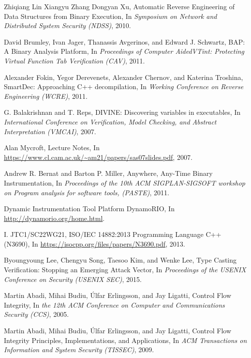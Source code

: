 \documentclass[11pt,a4paper,bibtotoc,idxtotoc,headsepline,footsepline,footexclude,BCOR20mm,DIV10]{scrbook}
\begin{document}
\begin{thebibliography}{50}
Zhiqiang Lin Xiangyu Zhang Dongyan Xu,
{Automatic Reverse Engineering of Data Structures from Binary Execution}, In
\emph{Symposium on Network and Distributed System Security (NDSS)}, 2010.

David Brumley, Ivan Jager, Thanassis Avgerinos, and Edward J. Schwartz,
{BAP: A Binary Analysis Platform}, 
In \emph{Proceedings of Computer AidedVTint: Protecting Virtual Function Tab Verification (CAV)}, 2011.

Alexander Fokin, Yegor Derevenets, Alexander Chernov, and Katerina Troshina,
{SmartDec: Approaching C++ decompilation}, 
In \emph{Working Conference on Reverse Engineering (WCRE)}, 2011.

G. Balakrishnan and T. Reps,
{DIVINE: Discovering variables in executables}, 
In \emph{International Conference on Verification, Model Checking, and Abstract Interpretation (VMCAI)}, 2007.

Alan Mycroft,
{Lecture Notes}, 
In \url{https://www.cl.cam.ac.uk/~am21/papers/sas07slides.pdf}, 2007.

Andrew R. Bernat and Barton P. Miller,
{Anywhere, Any-Time Binary Instrumentation}, 
In \emph{Proceedings of the 10th ACM SIGPLAN-SIGSOFT workshop on Program analysis for software tools, (PASTE)}, 2011.

Dynamic Instrumentation Tool Platform
{DynamoRIO}, 
In \url{http://dynamorio.org/home.html}.

I. JTC1/SC22WG21,
{ISO/IEC 14882:2013 Programming Language C++ (N3690)}, 
In \url{https://isocpp.org/files/papers/N3690.pdf}, 2013.

Byoungyoung Lee, Chengyu Song, Taesoo Kim, and Wenke Lee, 
{Type Casting Verification: Stopping an Emerging Attack Vector}, In
\emph{Proceedings of the USENIX Conference on Security (USENIX SEC)}, 2015.

Martin Abadi, Mihai Budiu, Úlfar Erlingsson, and Jay Ligatti,
{Control Flow Integrity}, In
\emph{the 12th ACM Conference on Computer and Communications Security (CCS)}, 2005.

Martin Abadi, Mihai Budiu, Úlfar Erlingsson, and Jay Ligatti,
{Control Flow Integrity Principles, Implementations, and Applications}, In
\emph{ACM Transactions on Information and System Security (TISSEC)}, 2009.


\end{thebibliography}
\end{document}
